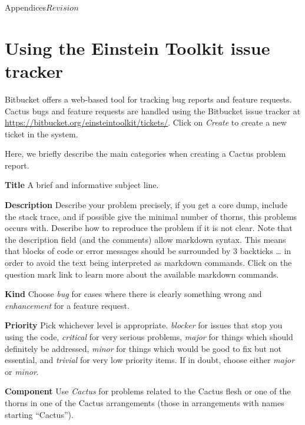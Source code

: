 \begin{cactuspart}{Appendices}{}{$Revision$}

\chapter{Using the Einstein Toolkit issue tracker}
\label{sec:Appendix.tickets}

Bitbucket offers a web-based tool for tracking bug reports and feature
requests.  Cactus bugs and feature requests are handled using the
Bitbucket issue tracker at
\url{https://bitbucket.org/einsteintoolkit/tickets/}.  Click on
\emph{Create} to create a new ticket in the system.

Here, we briefly describe the main categories when creating a Cactus
problem report.
\begin{Lentry}
\item[{\bf Title}] A brief and informative subject line.

\item[{\bf Description}] Describe your problem precisely, if you get a
  core dump, include the stack trace, and if possible give the minimal
  number of thorns, this problems occurs with.  Describe how to
  reproduce the problem if it is not clear.  Note that the description
  field (and the comments) allow markdown syntax.  This means that
  blocks of code or error messages should be surrounded by 3 backticks
  \code{\`{}\`{}\`{}} \ldots \code{\`{}\`{}\`{}} in order to avoid the text
  being interpreted as markdown commands.  Click on the question mark link to
  learn more about the available markdown commands.

\item[{\bf Kind}] Choose {\em bug} for cases where there is clearly
something wrong and {\em enhancement} for a feature request.

\item[{\bf Priority}] Pick whichever level is appropriate.  {\em
  blocker} for issues that stop you using the code, {\em critical} for
  very serious problems, {\em major} for things which should
  definitely be addressed, {\em minor} for things which would be good
  to fix but not essential, and {\em trivial} for very low priority
  items.  If in doubt, choose either {\em major} or {\em minor}.

\item[{\bf Component}] Use {\em Cactus} for problems related to the
  Cactus flesh or one of the thorns in one of the Cactus arrangements
  (those in arrangements with names starting ``Cactus'').


\end{Lentry}
\end{cactuspart}
